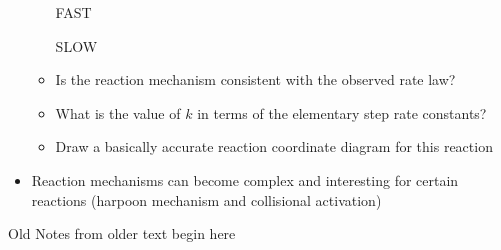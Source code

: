\documentclass[12pt, openany, letterpaper]{memoir}
\begin{document}
\begin{itemize}
\begin{itemize}
		 \hspace{1em} FAST
		
		 \hspace{1em} SLOW
		\item Is the reaction mechanism consistent with the observed rate law?
		\item What is the value of $k$ in terms of the elementary step rate constants?
		\item Draw a basically accurate reaction coordinate diagram for this reaction
	\end{itemize}
	\item Reaction mechanisms can become complex and interesting for certain reactions (harpoon mechanism and collisional activation)
\end{itemize}

{\HUGE Old Notes from older text begin here}
\end{document}
